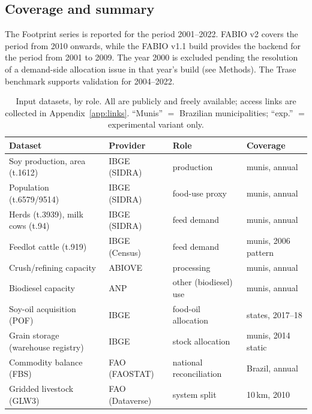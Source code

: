 \subsection{Coverage and summary}\label{subsec:coverage}

The Footprint series is reported for the period 2001–2022. FABIO v2 covers the period from 2010 onwards, while the FABIO v1.1 build provides the backend for the period from 2001 to 2009. The year 2000 is excluded pending the resolution of a demand-side allocation issue in that year's build (see Methods). The Trase benchmark supports validation for 2004–2022.

\begin{table}[htbp]
\small
\caption{Input datasets, by role. All are publicly and freely available;
access links are collected in Appendix~\ref{app:links}. ``Munis'' $=$
Brazilian municipalities; ``exp.'' $=$ experimental variant only.}\label{tab:data}
\begin{tabular}{@{}p{3.5cm}p{2.3cm}p{3.0cm}p{2.6cm}@{}}
\toprule
Dataset & Provider & Role & Coverage \\
\midrule
Soy production, area (t.1612)      & IBGE (SIDRA)        & production            & munis, annual \\
Population (t.6579/9514)           & IBGE (SIDRA)        & food-use proxy        & munis, annual \\
Herds (t.3939), milk cows (t.94)   & IBGE (SIDRA)        & feed demand           & munis, annual \\
Feedlot cattle (t.919)             & IBGE (Census)       & feed demand           & munis, 2006 pattern \\
Crush/refining capacity            & ABIOVE              & processing            & munis, annual \\
Biodiesel capacity                 & ANP                 & other (biodiesel) use & munis, annual \\
Soy-oil acquisition (POF)          & IBGE                & food-oil allocation   & states, 2017--18 \\
Grain storage (warehouse registry) & IBGE                & stock allocation      & munis, 2014 static \\
Commodity balance (FBS)            & FAO (FAOSTAT)       & national reconciliation & Brazil, annual \\
Gridded livestock (GLW3)           & FAO (Dataverse)     & system split          & 10\,km, 2010 \\

\end{tabular}
\end{table}
